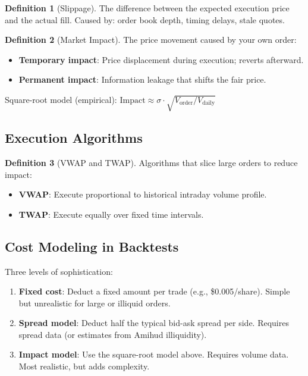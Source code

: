 \documentclass[a4paper, 11pt]{report}
\theoremstyle{definition}
\newtheorem{definition}{Definition}[chapter]
\theoremstyle{remark}
\begin{document}
\begin{definition}[Slippage]
    The difference between the expected execution price and the actual fill.
    Caused by: order book depth, timing delays, stale quotes.
\end{definition}

\begin{definition}[Market Impact]
    The price movement caused by your own order:
    \begin{itemize}
        \item \textbf{Temporary impact}: Price displacement during execution;
              reverts afterward.
        \item \textbf{Permanent impact}: Information leakage that shifts the
              fair price.
    \end{itemize}
    Square-root model (empirical):
    $\text{Impact} \approx \sigma \cdot \sqrt{V_{\text{order}} / V_{\text{daily}}}$
\end{definition}

\subsection{Execution Algorithms}

\begin{definition}[VWAP and TWAP]
    Algorithms that slice large orders to reduce impact:
    \begin{itemize}
        \item \textbf{VWAP}: Execute proportional to historical intraday volume
              profile.
        \item \textbf{TWAP}: Execute equally over fixed time intervals.
    \end{itemize}
\end{definition}

\subsection{Cost Modeling in Backtests}

Three levels of sophistication:

\begin{enumerate}
    \item \textbf{Fixed cost}: Deduct a fixed amount per trade (e.g., \$0.005/share).
          Simple but unrealistic for large or illiquid orders.
    \item \textbf{Spread model}: Deduct half the typical bid-ask spread per side.
          Requires spread data (or estimates from Amihud illiquidity).
    \item \textbf{Impact model}: Use the square-root model above.  Requires
          volume data.  Most realistic, but adds complexity.
\end{enumerate}
\end{document}
